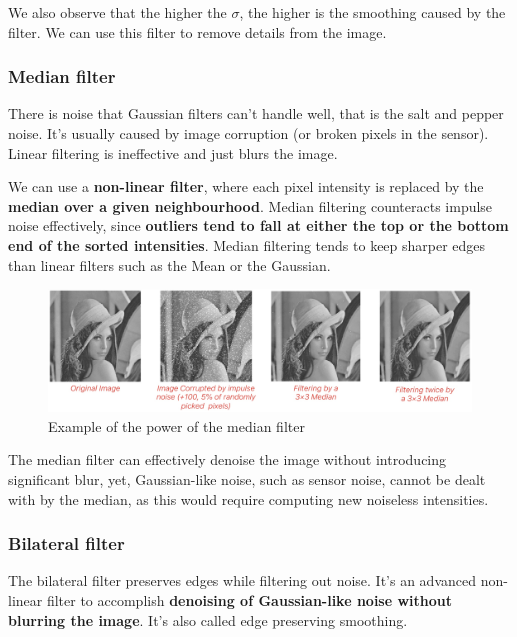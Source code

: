 We also observe that the higher the $\sigma$, the higher is the smoothing caused by the filter.
We can use this filter to remove details from the image.

\subsubsection{Median filter}

There is noise that Gaussian filters can't handle well, that is the salt and pepper noise. It's usually caused by image corruption (or broken pixels in the sensor).
Linear filtering is ineffective and just blurs the image.

We can use a \textbf{non-linear filter}, where each pixel intensity is replaced by the \textbf{median over a given neighbourhood}.
Median filtering counteracts impulse noise effectively, since \textbf{outliers tend to fall at either the top or the bottom end of the sorted intensities}.
Median filtering tends to keep sharper edges than linear filters such as the Mean or the Gaussian.

\begin{figure}[htbp]
  \centering
  \includegraphics[width=0.9\linewidth]{./img/median_filter_application.jpg}
  \caption{Example of the power of the median filter}
  \label{fig:median_filter_application}
\end{figure}

The median filter can effectively denoise the image without introducing significant blur, yet, Gaussian-like noise, such as sensor noise, cannot be dealt with by the median, as this would require computing new noiseless intensities.

\subsubsection{Bilateral filter}

The bilateral filter preserves edges while filtering out noise.
It's an advanced non-linear filter to accomplish \textbf{denoising of Gaussian-like noise without blurring the image}.
It's also called edge preserving smoothing.

